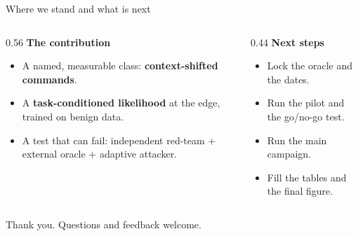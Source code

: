 \documentclass[aspectratio=169]{beamer}
\newcommand{\key}[1]{\textcolor{accent}{\textbf{#1}}}
\begin{document}
\begin{frame}{Where we stand and what is next}
\begin{columns}[T]
\begin{column}{0.56\textwidth}
\textbf{The contribution}
\begin{itemize}
  \item A named, measurable class: \key{context-shifted commands}.
  \item A \key{task-conditioned likelihood} at the edge, trained on benign data.
  \item A test that can fail: independent red-team + external oracle +
        adaptive attacker.
\end{itemize}
\end{column}
\begin{column}{0.44\textwidth}
\textbf{Next steps}
\begin{itemize}
  \item Lock the oracle and the dates.
  \item Run the pilot and the go/no-go test.
  \item Run the main campaign.
  \item Fill the tables and the final figure.
\end{itemize}
\end{column}
\end{columns}
\vspace{0.8em}
\begin{center}
\large\textcolor{accent}{Thank you. Questions and feedback welcome.}
\end{center}
\end{frame}
\end{document}
